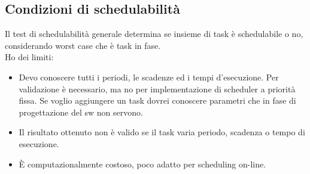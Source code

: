 \documentclass[12pt, oneside]{extbook}
\begin{document}
\subsection{Condizioni di schedulabilità}
Il test di schedulabilità generale determina se insieme di task è schedulabile o no, considerando worst case che è task in fase.\\ Ho dei limiti:
\begin{itemize}
\item Devo conoscere tutti i periodi, le scadenze ed i tempi d'esecuzione. Per validazione è necessario, ma no per implementazione di scheduler a priorità fissa. Se voglio aggiungere un task dovrei conoscere parametri che in fase di progettazione del sw non servono.
\item Il risultato ottenuto non è valido se il task varia periodo, scadenza o tempo di esecuzione.
\item È computazionalmente costoso, poco adatto per scheduling on-line.
\end{itemize}
\end{document}
